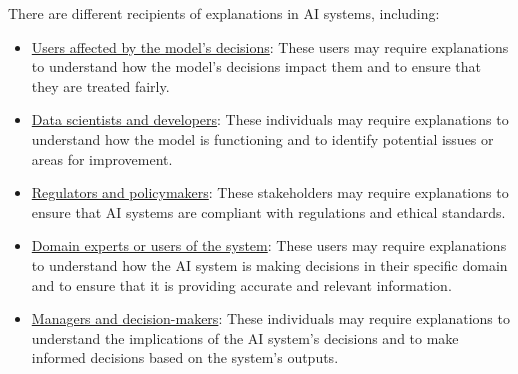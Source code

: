 There are different recipients of explanations in AI systems, including:
\begin{itemize}
    \item \ul{Users affected by the model's decisions}: These users may require explanations to understand how the model's decisions impact them and to ensure that they are treated fairly.
    \item \ul{Data scientists and developers}: These individuals may require explanations to understand how the model is functioning and to identify potential issues or areas for improvement.
    \item \ul{Regulators and policymakers}: These stakeholders may require explanations to ensure that AI systems are compliant with regulations and ethical standards.
    \item \ul{Domain experts or users of the system}: These users may require explanations to understand how the AI system is making decisions in their specific domain and to ensure that it is providing accurate and relevant information.
    \item \ul{Managers and decision-makers}: These individuals may require explanations to understand the implications of the AI system's decisions and to make informed decisions based on the system's outputs. 
\end{itemize}

